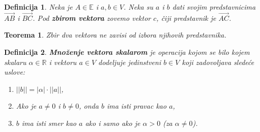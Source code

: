 \documentclass[a4paper,12pt,twoside]{report}
\newtheorem{theorem}{Teorema}[section]
\newtheorem{definition}{Definicija}[section]
\numberwithin{algorithm}{section}
\begin{document}
\begin{definition}
    Neka je $A \in \mathbb{E}$ i $a, b \in V$. Neka su $a$ i $b$ dati svojim predstavnicima $\overrightarrow{AB}$ i $\overrightarrow{BC}$. Pod \textbf{zbirom vektora} zovemo vektor $c$, čiji predstavnik je $\overrightarrow{AC}$.
    \begin{figure}[!h]
    \centering
\end{figure}
\end{definition}



\begin{theorem}
    Zbir dva vektora ne zavisi od izbora njihovih predstavnika.
\end{theorem}

\newpage
\begin{definition}
    \textbf{Množenje vektora skalarom} je operacija kojom se bilo kojem skalaru $\alpha \in \mathbb{R}$ i vektoru $a \in V$ dodeljuje jedinstveni $b \in V$ koji zadovoljava sledeće uslove:
    \begin{enumerate}
        \item $||b|| = |\alpha| \cdot ||a||$,
        \item Ako je $a \neq 0$ i $b \neq 0$, onda $b$ ima isti pravac kao $a$,
        \item $b$ ima isti smer kao $a$ ako i samo ako je $\alpha > 0$ (za $\alpha \neq 0$).
    \end{enumerate}
\end{definition}
\end{document}
